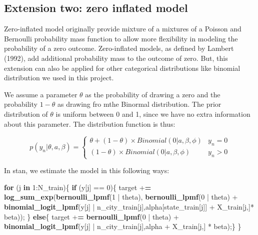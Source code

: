 \documentclass[]{tufte-handout}
\newenvironment{Shaded}{}{}
\newcommand{\ControlFlowTok}[1]{\textcolor[rgb]{0.00,0.44,0.13}{\textbf{#1}}}
\newcommand{\DecValTok}[1]{\textcolor[rgb]{0.25,0.63,0.44}{#1}}
\newcommand{\ErrorTok}[1]{\textcolor[rgb]{1.00,0.00,0.00}{\textbf{#1}}}
\newcommand{\KeywordTok}[1]{\textcolor[rgb]{0.00,0.44,0.13}{\textbf{#1}}}
\newcommand{\NormalTok}[1]{#1}
\newcommand{\OperatorTok}[1]{\textcolor[rgb]{0.40,0.40,0.40}{#1}}
\newcommand{\StringTok}[1]{\textcolor[rgb]{0.25,0.44,0.63}{#1}}
\begin{document}
\hypertarget{extension-two-zero-inflated-model}{%
\subsection{Extension two: zero inflated
model}\label{extension-two-zero-inflated-model}}

Zero-inflated model originally provide mixture of a mixtures of a
Poisson and Bernoulli probability mass function to allow more
flexibility in modeling the probability of a zero outcome. Zero-inflated
models, as defined by Lambert (1992), add additional probability mass to
the outcome of zero. But, this extension can also be applied for other
categorical distributions like binomial distribution we used in this
project.

We assume a parameter \(\theta\) as the probability of drawing a zero
and the probability \(1-\theta\) as drawing fro mthe Binormal
distribution. The prior distribution of \(\theta\) is uniform between 0
and 1, since we have no extra information about this parameter. The
distribution function is thus:

\[p(y_n | \theta,a,\beta) =\begin{cases} 
\theta + (1-\theta) \times Binomial(0 |a,\beta,\phi ) & y_n =0 \\
(1-\theta) \times Binomial(0 |a,\beta,\phi )  & y_n > 0 \end{cases}\]

In stan, we estimate the model in this following ways:

\begin{Shaded}
\begin{Highlighting}[]
\ControlFlowTok{for}\NormalTok{ (j }\ControlFlowTok{in} \DecValTok{1}\OperatorTok{:}\NormalTok{N_train)\{}
    \ControlFlowTok{if}\NormalTok{ (y[j] }\OperatorTok{==}\StringTok{ }\DecValTok{0}\NormalTok{)\{}
\NormalTok{      target }\OperatorTok{+}\ErrorTok{=}\StringTok{ }\KeywordTok{log_sum_exp}\NormalTok{(}\KeywordTok{bernoulli_lpmf}\NormalTok{(}\DecValTok{1} \OperatorTok{|}\StringTok{ }\NormalTok{theta), }\KeywordTok{bernoulli_lpmf}\NormalTok{(}\DecValTok{0} \OperatorTok{|}\StringTok{ }\NormalTok{theta) }\OperatorTok{+}\StringTok{ }\KeywordTok{binomial_logit_lpmf}\NormalTok{(y[j] }\OperatorTok{|}\StringTok{ }\NormalTok{n_city_train[j],alpha[state_train[j]] }\OperatorTok{+}\StringTok{ }\NormalTok{X_train[j,]}\OperatorTok{*}\StringTok{ }\NormalTok{beta));}
\NormalTok{      \}}
    \ControlFlowTok{else}\NormalTok{\{}
\NormalTok{      target }\OperatorTok{+}\ErrorTok{=}\StringTok{ }\KeywordTok{bernoulli_lpmf}\NormalTok{(}\DecValTok{0} \OperatorTok{|}\StringTok{ }\NormalTok{theta) }\OperatorTok{+}\StringTok{ }\KeywordTok{binomial_logit_lpmf}\NormalTok{(y[j] }\OperatorTok{|}\StringTok{ }\NormalTok{n_city_train[j],alpha }\OperatorTok{+}\StringTok{ }\NormalTok{X_train[j,] }\OperatorTok{*}\StringTok{ }\NormalTok{beta);\}}
\NormalTok{  \}}
\end{Highlighting}
\end{Shaded}
\end{document}
